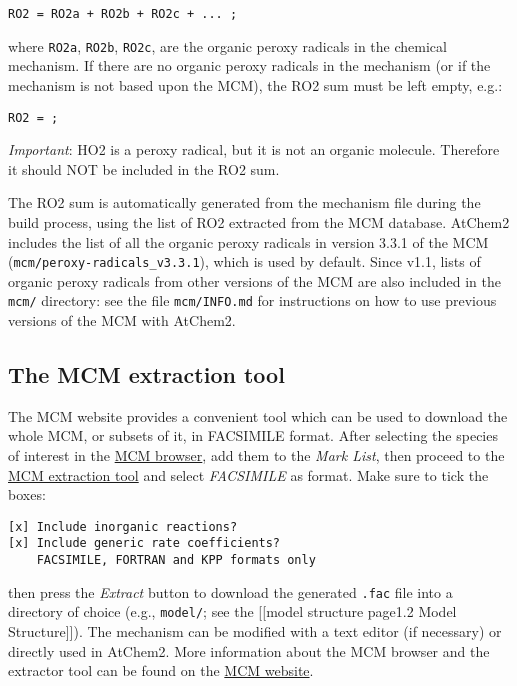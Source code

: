 \begin{verbatim}
RO2 = RO2a + RO2b + RO2c + ... ;
\end{verbatim}

where \texttt{RO2a}, \texttt{RO2b}, \texttt{RO2c}, are the organic
peroxy radicals in the chemical mechanism. If there are no organic
peroxy radicals in the mechanism (or if the mechanism is not based
upon the MCM), the RO2 sum must be left empty, e.g.:

\begin{verbatim}
RO2 = ;
\end{verbatim}

\emph{Important}: HO2 is a peroxy radical, but it is not an organic
molecule. Therefore it should NOT be included in the RO2 sum.

The RO2 sum is automatically generated from the mechanism file during
the build process, using the list of RO2 extracted from the MCM
database. AtChem2 includes the list of all the organic peroxy radicals
in version 3.3.1 of the MCM (\texttt{mcm/peroxy-radicals\_v3.3.1}),
which is used by default. Since v1.1, lists of organic peroxy radicals
from other versions of the MCM are also included in the \texttt{mcm/}
directory: see the file \texttt{mcm/INFO.md} for instructions on how
to use previous versions of the MCM with AtChem2.

\subsection{The MCM extraction tool} \label{subsec:the-mcm-extraction-tool}

The MCM website provides a convenient tool which can be used to
download the whole MCM, or subsets of it, in FACSIMILE format. After
selecting the species of interest in the
\href{http://mcm.leeds.ac.uk/MCMv3.3.1/roots.htt}{MCM browser}, add
them to the \emph{Mark List}, then proceed to the
\href{http://mcm.leeds.ac.uk/MCMv3.3.1/extract.htt}{MCM extraction
  tool} and select \emph{FACSIMILE} as format. Make sure to tick the
boxes:

\begin{verbatim}
[x] Include inorganic reactions?
[x] Include generic rate coefficients?
    FACSIMILE, FORTRAN and KPP formats only
\end{verbatim}

then press the \emph{Extract} button to download the generated
\texttt{.fac} file into a directory of choice (e.g., \texttt{model/};
see the {[}{[}model structure page\textbar{}1.2 Model
Structure{]}{]}).  The mechanism can be modified with a text editor
(if necessary) or directly used in AtChem2. More information about the
MCM browser and the extractor tool can be found on the
\href{http://mcm.leeds.ac.uk}{MCM website}.

